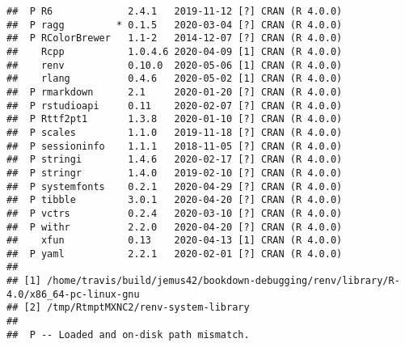 \documentclass[ngerman,a4paper,]{scrartcl}
\begin{document}
\begin{verbatim}
##  P R6             2.4.1   2019-11-12 [?] CRAN (R 4.0.0)              
##  P ragg         * 0.1.5   2020-03-04 [?] CRAN (R 4.0.0)              
##  P RColorBrewer   1.1-2   2014-12-07 [?] CRAN (R 4.0.0)              
##    Rcpp           1.0.4.6 2020-04-09 [1] CRAN (R 4.0.0)              
##    renv           0.10.0  2020-05-06 [1] CRAN (R 4.0.0)              
##    rlang          0.4.6   2020-05-02 [1] CRAN (R 4.0.0)              
##  P rmarkdown      2.1     2020-01-20 [?] CRAN (R 4.0.0)              
##  P rstudioapi     0.11    2020-02-07 [?] CRAN (R 4.0.0)              
##  P Rttf2pt1       1.3.8   2020-01-10 [?] CRAN (R 4.0.0)              
##  P scales         1.1.0   2019-11-18 [?] CRAN (R 4.0.0)              
##  P sessioninfo    1.1.1   2018-11-05 [?] CRAN (R 4.0.0)              
##  P stringi        1.4.6   2020-02-17 [?] CRAN (R 4.0.0)              
##  P stringr        1.4.0   2019-02-10 [?] CRAN (R 4.0.0)              
##  P systemfonts    0.2.1   2020-04-29 [?] CRAN (R 4.0.0)              
##  P tibble         3.0.1   2020-04-20 [?] CRAN (R 4.0.0)              
##  P vctrs          0.2.4   2020-03-10 [?] CRAN (R 4.0.0)              
##  P withr          2.2.0   2020-04-20 [?] CRAN (R 4.0.0)              
##    xfun           0.13    2020-04-13 [1] CRAN (R 4.0.0)              
##  P yaml           2.2.1   2020-02-01 [?] CRAN (R 4.0.0)              
## 
## [1] /home/travis/build/jemus42/bookdown-debugging/renv/library/R-4.0/x86_64-pc-linux-gnu
## [2] /tmp/RtmptMXNC2/renv-system-library
## 
##  P -- Loaded and on-disk path mismatch.
\end{verbatim}


\end{document}
